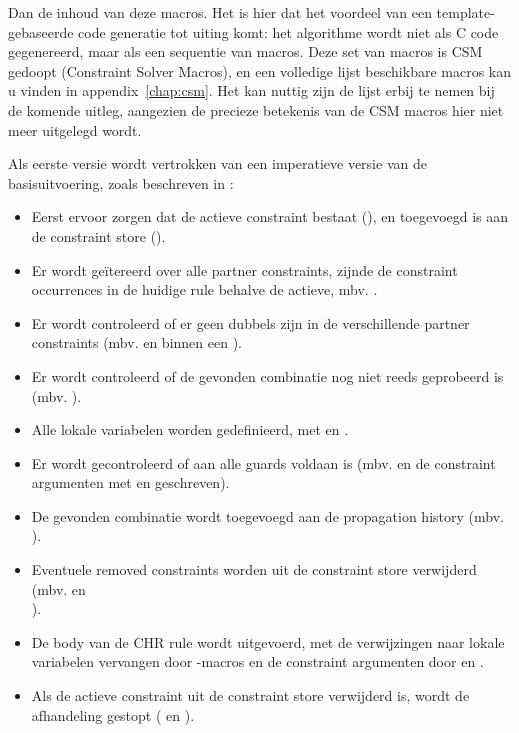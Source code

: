 Dan de inhoud van deze macros. Het is hier dat het voordeel van een template-gebaseerde code generatie tot uiting komt: het algorithme wordt niet als C code gegenereerd, maar als een sequentie van macros. Deze set van macros is CSM gedoopt (Constraint Solver Macros), en een volledige lijst beschikbare macros kan u vinden in appendix~\ref{chap:csm}. Het kan nuttig zijn de lijst erbij te nemen bij de komende uitleg, aangezien de precieze betekenis van de CSM macros hier niet meer uitgelegd wordt.

Als eerste versie wordt vertrokken van een imperatieve versie van de basisuitvoering, zoals beschreven in \cite{tomsphdthesis}:
\begin{itemize}
  \item Eerst ervoor zorgen dat de actieve constraint bestaat (), en toegevoegd is aan de constraint store ().
  \item Er wordt ge\"itereerd over alle partner constraints, zijnde de constraint occurrences in de huidige rule behalve de actieve, mbv. .
  \item Er wordt controleerd of er geen dubbels zijn in de verschillende partner constraints (mbv.   en  binnen een ).
  \item Er wordt controleerd of de gevonden combinatie nog niet reeds geprobeerd is (mbv. ).
  \item Alle lokale variabelen worden gedefinieerd, met  en .
  \item Er wordt gecontroleerd of aan alle guards voldaan is (mbv.  en de constraint argumenten met  en  geschreven).
  \item De gevonden combinatie wordt toegevoegd aan de propagation history (mbv. ).
  \item Eventuele removed constraints worden uit de constraint store verwijderd (mbv.  en \\ ).
  \item De body van de CHR rule wordt uitgevoerd, met de verwijzingen naar lokale variabelen vervangen door -macros en de constraint argumenten door  en .
  \item Als de actieve constraint uit de constraint store verwijderd is, wordt de afhandeling gestopt ( en ).
\end{itemize}

